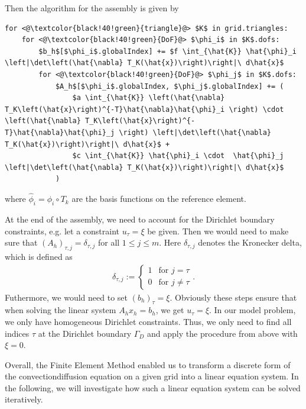 \documentclass[letterpaper,10pt,english, openany]{sphinxmanual}
\begin{document}
Then the algorithm for the assembly is given by

\lstset{language=Python}
\begin{lstlisting}[mathescape=true]
for <@\textcolor{black!40!green}{triangle}@> $K$ in grid.triangles:
	for <@\textcolor{black!40!green}{DoF}@> $\phi_i$ in $K$.dofs:
		$b_h$[$\phi_i$.globalIndex] += $f \int_{\hat{K}} \hat{\phi}_i \left|\det\left(\hat{\nabla} T_K(\hat{x})\right)\right|\ d\hat{x}$
		for <@\textcolor{black!40!green}{DoF}@> $\phi_j$ in $K$.dofs:
			$A_h$[$\phi_i$.globalIndex, $\phi_j$.globalIndex] += (
				$a \int_{\hat{K}} \left(\hat{\nabla} T_K\left(\hat{x}\right)^{-T}\hat{\nabla}\hat{\phi}_i \right) \cdot \left(\hat{\nabla} T_K\left(\hat{x}\right)^{-T}\hat{\nabla}\hat{\phi}_j \right) \left|\det\left(\hat{\nabla} T_K(\hat{x})\right)\right|\ d\hat{x}$ +
				$c \int_{\hat{K}} \hat{\phi}_i \cdot  \hat{\phi}_j \left|\det\left(\hat{\nabla} T_K(\hat{x})\right)\right|\ d\hat{x}$
			)
\end{lstlisting}

where \(\hat{\phi}_i = \phi_i \circ T_k\) are the basis functions on the reference element.

At the end of the assembly, we need to account for the Dirichlet boundary constraints, e.g. let a constraint \(u_{\tau} = \xi\) be given.
Then we would need to make sure that \((A_h)_{\tau,j} = \delta_{\tau,j}\) for all \(1 \leq j \leq m\).
Here \(\delta_{\tau,j}\) denotes the Kronecker delta, which is defined as
\begin{equation*}
\begin{split}\delta_{\tau,j} := \begin{cases}
  1 & \text{for } j = \tau \\
  0 & \text{for } j \neq \tau
  \end{cases}.\end{split}
\end{equation*}
Futhermore, we would need to set \((b_h)_{\tau} = \xi\).
Obviously these steps ensure that when solving the linear system \(A_h x_h = b_h\),
we get \(u_{\tau} = \xi\). In our model problem, we only have homogeneous Dirichlet constraints.
Thus, we only need to find all indices \(\tau\) at the Dirichlet boundary \(\Gamma_D\)
and apply the procedure from above with \(\xi = 0\).

Overall, the Finite Element Method enabled us to transform a discrete form of the convection\sphinxhyphen{}diffusion equation
on a given grid into a linear equation system. In the following, we will investigate how such a linear equation system can be solved iteratively.
\end{document}
